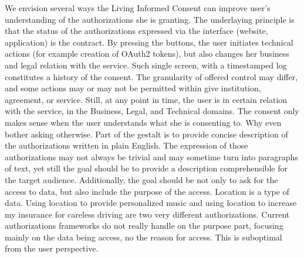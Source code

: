 We envision several ways the Living Informed Consent can improve user's understanding of the authorizations she is granting. 
The underlaying principle is that the status of the authorizations expressed via the interface (website, application) is the contract.
By pressing the buttons, the user initiates technical actions (for example creation of OAuth2 tokens), but also changes her business and legal relation with the service.
Such single screen, with a timestamped log constitutes a history of the consent. 
The granularity of offered control may differ, and some actions may or may not be permitted within give institution, agreement, or service.
Still, at any point in time, the user is in certain relation with the service, in the Business, Legal, and Technical domains. 
The consent only makes sense when the user understands what she is consenting to.
Why even bother asking otherwise.
Part of the gestalt is to provide concise description of the authorizations written in plain English.
The expression of those authorizations may not always be trivial and may sometime turn into paragraphs of text, yet still the goal should be to provide a description comprehensible for the target audience.
Additionally, the goal should be not only to ask for the access to data, but also include the purpose of the access.
Location is a type of data.
Using location to provide personalized music and using location to increase my insurance for careless driving are two very different authorizations.
Current authorizations frameworks do not really handle on the purpose part, focusing mainly on the data being access, no the reason for access.
This is suboptimal from the user perspective. 

